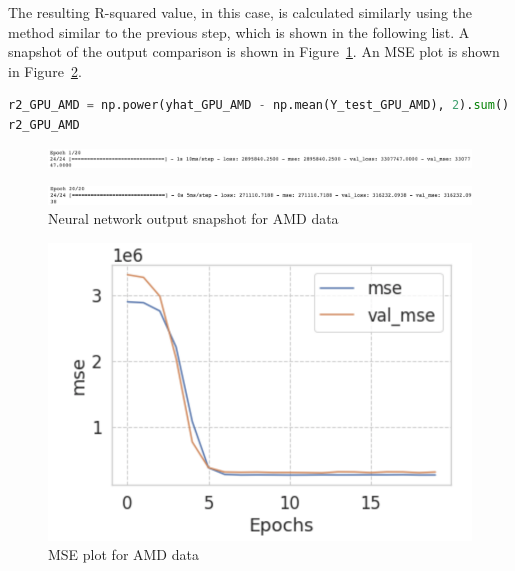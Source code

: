 \documentclass{scrartcl}
\begin{document}
\noindent The resulting R-squared value, in this case, is calculated similarly using the method similar to the previous step, which is shown in the following list. A snapshot of the output comparison is shown in Figure~\ref{fig:NN18-19}. An MSE plot is shown in Figure~\ref{fig:NN17}. \\

\begin{lstlisting}[language=Python, caption= Code output for MSE AMD training,basicstyle=\tiny,captionpos=b]
r2_GPU_AMD = np.power(yhat_GPU_AMD - np.mean(Y_test_GPU_AMD), 2).sum() / np.power(Y_test_GPU_AMD - np.mean(Y_test_GPU_AMD), 2).sum()
r2_GPU_AMD

\end{lstlisting}

\begin{figure}
         \centering
         \includegraphics[width=\textwidth]{Graphics/Neural Network Images/NN18.png}
\end{figure}
     
\begin{figure}
         \centering
         \includegraphics[width=\textwidth]{Graphics/Neural Network Images/NN19.png}
         \caption{Neural network output snapshot for AMD data}
         \label{fig:NN18-19}
\end{figure}


\begin{figure}[H]
	\begin{center}
		\includegraphics[scale=1.0]{Graphics/Neural Network Images/NN17.png}
	\end{center}
	\caption{MSE plot for AMD data}
	\label{fig:NN17}
\end{figure}
\end{document}
